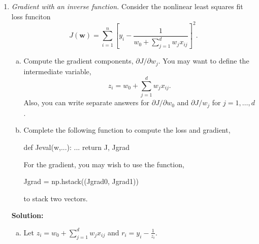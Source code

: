 \documentclass[11pt]{article}
\newcommand{\wbf}{\mathbf{w}}
\begin{document}
\begin{enumerate}
\begin{enumerate}[(a)]
Therefore:
$$\frac{\partial J}{\partial w_j} = \sum_{i=1}^N 2r_i \left(-\frac{x_{ij}}{\hat{y}_i}\right) = -2\sum_{i=1}^N \frac{r_i x_{ij}}{\hat{y}_i}$$

For $\frac{\partial J}{\partial b}$:
$$\frac{\partial J}{\partial b} = \sum_{i=1}^N 2r_i \frac{\partial r_i}{\partial b} = \sum_{i=1}^N 2r_i \left(-\frac{1}{\hat{y}_i}\right) = -2\sum_{i=1}^N \frac{r_i}{\hat{y}_i}$$

\item 
\begin{python}
def Jeval(w, b, X, y):
    # Compute predictions
    yhat = X @ w + b
    
    # Compute residuals in log domain
    r = np.log(y) - np.log(yhat)
    
    # Compute loss
    J = np.sum(r**2)
    
    # Compute gradients
    Jgradw = -2 * np.sum((r / yhat)[:, np.newaxis] * X, axis=0)
    Jgradb = -2 * np.sum(r / yhat)
    
    return J, Jgradw, Jgradb
\end{python}
\end{enumerate}

\item \emph{Gradient with an inverse function.}
Consider the nonlinear least squares fit loss funciton
\[
    J(\wbf) = \sum_{i=1}^n \left[y_i -
        \frac{1}{w_0 + \sum_{j=1}^d w_jx_{ij}}\right]^2.
\]
\begin{enumerate}[(a)]
\item Compute the gradient components, $\partial J/\partial w_j$.
You may want to define the intermediate variable,
\[
    z_i = w_0 + \sum_{j=1}^d w_jx_{ij}.
\]
Also, you can write separate answers for $\partial J/\partial w_0$ and $\partial J/w_j$
for $j = 1,\ldots,d$.

\item Complete the following function to compute the loss and gradient,
\begin{python}
    def Jeval(w,...):
        ...
        return J, Jgrad
\end{python}
For the gradient, you may wish to use the function,
\begin{python}
    Jgrad = np.hstack((Jgrad0, Jgrad1))
\end{python}
to stack two vectors.
\end{enumerate}

\textbf{Solution:}
\begin{enumerate}[(a)]
\item Let $z_i = w_0 + \sum_{j=1}^d w_jx_{ij}$ and $r_i = y_i - \frac{1}{z_i}$.


\end{enumerate}
\end{enumerate}
\end{document}
